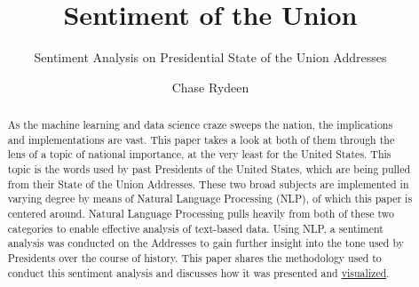 \documentclass[acmtog, review, screen]{acmart}
\begin{document}
\title{Sentiment of the Union}
 \subtitle{Sentiment Analysis on Presidential State of the Union Addresses}
 
\author{Chase Rydeen}

\begin{abstract}
As the machine learning and data science craze sweeps the nation, the implications and implementations are vast.
This paper takes a look at both of them through the lens of a topic of national importance, at the very least for the United States.
This topic is the words used by past Presidents of the United States, which are being pulled from their State of the Union Addresses.
These two broad subjects are implemented in varying degree by means of Natural Language Processing (NLP), of which this paper is centered around.
Natural Language Processing pulls heavily from both of these two categories to enable effective analysis of text-based data.
Using NLP, a sentiment analysis was conducted on the Addresses to gain further insight into the tone used by Presidents over the course of history.
This paper shares the methodology used to conduct this sentiment analysis and discusses how it was presented and \href{https://turing.cs.olemiss.edu/~dcrydeen/thesis/index.html}{visualized}.
\end{abstract}

\maketitle
\end{document}

